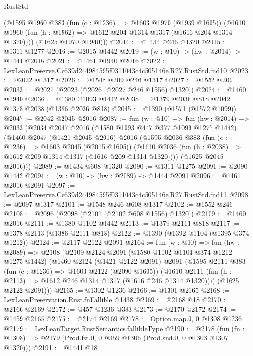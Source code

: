 \begin{lexlean}{RustStd}
\begin{coremodule}
        (@1595
          @1960
          @383
          (fun (c : @1236) => @1603 @1970 (@1939 @1605))
          (@1610 @1960 (fun (h : @1962) => @1612 @204 @1314 @1317 (@1616 @204 @1314 @1320))))
        (@1625 @1970 @1940)))
@2014 := @1434 @246 @1320
@2015 := @1311 @1277
@2016 := @2015 @1442
@2019 := (w : @10) -> (hw : @2014) -> @1444 @2016
@2021 := @1461 @1940 @2016
@2022 := LexLeanPreserve.Cc639d244984595f0311043c4c505146e.R27.RustStd.fnd10
@2023 := @2022 @1317
@2026 := @1548 @209 @246 @1317
@2027 := @1552 @209
@2033 := @2021 (@2023 (@2026 (@2027 @246 @1556) @1320))
@2034 := @1460 @1940
@2036 := @1380 @1093 @1442
@2038 := @1379 @2036 @818
@2042 := @1378 @2038 (@1386 @2036 @818)
@2045 := @1390 (@1571 (@1572 @1099))
@2047 := @2042 @2045 @2016
@2087 := fun (w : @10) =>
  fun (hw : @2014) =>
  @2033
    (@2034
      @2047
      @2016
      (@1580 @1093 @447 @377 @1099 @1277 @1442)
      (@1460
        @2047
        (@1421 @2045 @2016)
        @2016
        (@1595
          @2036
          @383
          (fun (c : @1236) => @1603 @2045 (@2015 @1605))
          (@1610 @2036 (fun (h : @2038) => @1612 @209 @1314 @1317 (@1616 @209 @1314 @1320))))
        (@1625 @2045 @2016)))
@2089 := @1434 @608 @1320
@2090 := @1311 @1275
@2091 := @2090 @1442
@2094 := (w : @10) -> (hw : @2089) -> @1444 @2091
@2096 := @1461 @2016 @2091
@2097 := LexLeanPreserve.Cc639d244984595f0311043c4c505146e.R27.RustStd.fnd11
@2098 := @2097 @1317
@2101 := @1548 @246 @608 @1317
@2102 := @1552 @246
@2108 := @2096 (@2098 (@2101 (@2102 @608 @1556) @1320))
@2109 := @1460 @2016
@2111 := @1380 @1102 @1442
@2113 := @1379 @2111 @818
@2117 := @1378 @2113 (@1386 @2111 @818)
@2122 := @1390 (@1392 @1104 (@1395 @374 @1212))
@2124 := @2117 @2122 @2091
@2164 := fun (w : @10) =>
  fun (hw : @2089) =>
  @2108
    (@2109
      @2124
      @2091
      (@1580 @1102 @1104 @374 @1212 @1275 @1442)
      (@1460
        @2124
        (@1421 @2122 @2091)
        @2091
        (@1595
          @2111
          @383
          (fun (c : @1236) => @1603 @2122 (@2090 @1605))
          (@1610 @2111 (fun (h : @2113) => @1612 @246 @1314 @1317 (@1616 @246 @1314 @1320))))
        (@1625 @2122 @2091)))
@2165 := @1302 @1236
@2166 := @1301 @2165
@2168 := LexLeanPreservation.Rust.fnFallible @1438
@2169 := @2168 @18
@2170 := @2166 @2169
@2172 := @457 @1236 @383
@2173 := @2170 @2172
@2174 := @1459 @2165
@2175 := @2174 @2169
@2178 := Option.map.{0, 0} @1308 @1236
@2179 := LexLeanTarget.RustSemantics.fallibleType
@2190 := @2178
    (fun (fn : @1308) => @2179 (Prod.fst.{0, 0} @359 @1306 (Prod.snd.{0, 0} @1303 @1307 @1320)))
@2191 := @1441 @18

\end{coremodule}
\end{lexlean}
